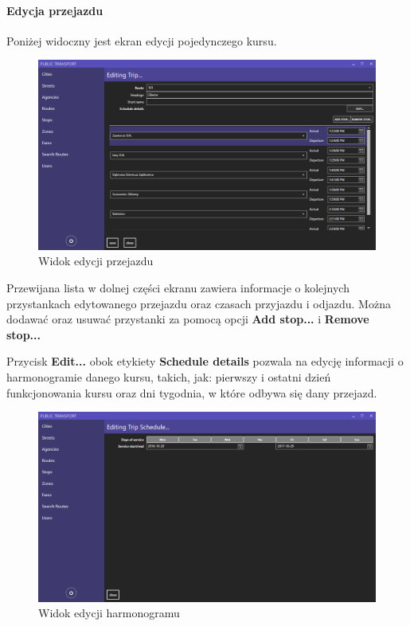 \documentclass[10pt,a4paper]{article}
\begin{document}
\paragraph{Edycja przejazdu}
Poniżej widoczny jest ekran edycji pojedynczego kursu.
\begin{figure}[H]
	\centering
	\includegraphics[width=15cm]{Resources/Images/11_edit_trip.png}
	\caption{Widok edycji przejazdu}
\end{figure}
Przewijana lista w dolnej części ekranu zawiera informacje o kolejnych przystankach edytowanego przejazdu oraz czasach przyjazdu i odjazdu. Można dodawać oraz usuwać przystanki za pomocą opcji \textbf{Add stop...} i \textbf{Remove stop...} 

Przycisk \textbf{Edit...} obok etykiety \textbf{Schedule details} pozwala na edycję informacji o harmonogramie danego kursu, takich, jak: pierwszy i ostatni dzień funkcjonowania kursu oraz dni tygodnia, w które odbywa się dany przejazd.
\begin{figure}[H]
	\centering
	\includegraphics[width=15cm]{Resources/Images/12_edit_schedule.png}
	\caption{Widok edycji harmonogramu}
\end{figure}
\end{document}
